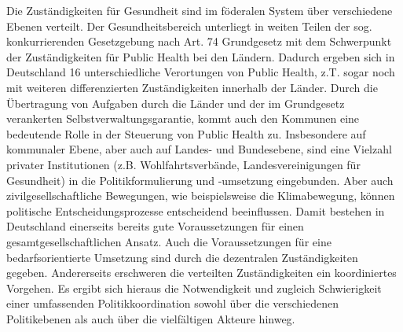 \documentclass{article}
\begin{document}
Die Zuständigkeiten für Gesundheit sind im föderalen System über verschiedene Ebenen verteilt. Der Gesundheitsbereich unterliegt in weiten Teilen der sog. konkurrierenden Gesetzgebung nach Art. 74 Grundgesetz mit dem Schwerpunkt der Zuständigkeiten für Public Health bei den Ländern. Dadurch ergeben sich in Deutschland 16 unterschiedliche Verortungen von Public Health, z.T. sogar noch mit weiteren differenzierten Zuständigkeiten innerhalb der Länder. Durch die Übertragung von Aufgaben durch die Länder und der im Grundgesetz verankerten Selbstverwaltungsgarantie, kommt auch den Kommunen eine bedeutende Rolle in der Steuerung von Public Health zu. Insbesondere auf kommunaler Ebene, aber auch auf Landes- und Bundesebene, sind eine Vielzahl privater Institutionen (z.B. Wohlfahrtsverbände, Landesvereinigungen für Gesundheit) in die Politikformulierung und ‑umsetzung eingebunden. Aber auch zivilgesellschaftliche Bewegungen, wie beispielsweise die Klimabewegung, können politische Entscheidungsprozesse entscheidend beeinflussen. Damit bestehen in Deutschland einerseits bereits gute Voraussetzungen für einen gesamtgesellschaftlichen Ansatz. Auch die Voraussetzungen für eine bedarfsorientierte Umsetzung sind durch die dezentralen Zuständigkeiten gegeben. Andererseits erschweren die verteilten Zuständigkeiten ein koordiniertes Vorgehen. Es ergibt sich hieraus die Notwendigkeit und zugleich Schwierigkeit einer umfassenden Politikkoordination sowohl über die verschiedenen Politikebenen als auch über die vielfältigen Akteure hinweg.
\end{document}

